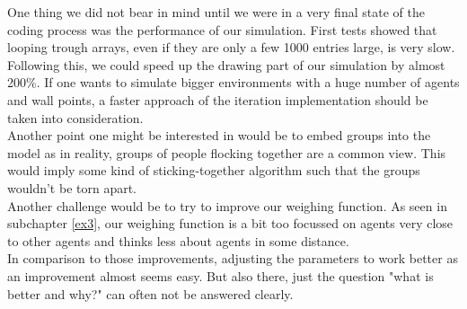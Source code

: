 One thing we did not bear in mind until we were in a very final state of the coding process was the performance of our simulation. First tests showed that looping trough arrays, even if they are only a few 1000 entries large, is very slow. Following this, we could speed up the drawing part of our simulation by almost 200\%. If one wants to simulate bigger environments with a huge number of agents and wall points, a faster approach of the iteration implementation should be taken into consideration.\\

Another point one might be interested in would be to embed groups into the model as in reality, groups of people flocking together are a common view. This would imply some kind of sticking-together algorithm such that the groups wouldn't be torn apart.\\
Another challenge would be to try to improve our weighing function. As seen in subchapter \ref{ex3}, our weighing function is a bit too focussed on agents very close to other agents and thinks less about agents in some distance.\\
In comparison to those improvements, adjusting the parameters to work better as an improvement almost seems easy. But also there, just the question "what is better and why?" can often not be answered clearly.\\
